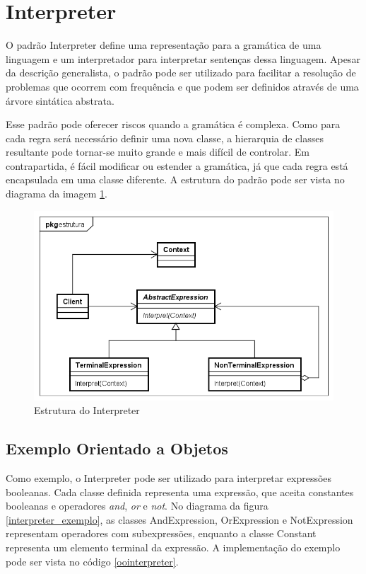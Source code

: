 \section{Interpreter}

O padrão Interpreter define uma representação para 
a gramática de uma linguagem e um interpretador para 
interpretar sentenças dessa linguagem. Apesar da 
descrição generalista, o padrão 
pode ser utilizado para facilitar a resolução de 
problemas que ocorrem com frequência e que podem 
ser definidos através de uma árvore sintática 
abstrata.

Esse padrão pode oferecer riscos quando a gramática 
é complexa. Como para cada regra será necessário 
definir uma nova classe, a hierarquia de classes 
resultante pode tornar-se muito grande e mais 
difícil de controlar. Em contrapartida, é 
fácil modificar ou estender a gramática, já 
que cada regra está encapsulada em uma classe 
diferente. A estrutura do padrão pode ser vista 
no diagrama da imagem \ref{interpreter_struct}.

\begin{figure}[htb]
	\caption{\label{interpreter_struct}Estrutura do Interpreter}
	\begin{center}
	    \includegraphics[scale=0.5]{5_padroes-contexto-funcional/5.3_comportamentais/5.3.03_interpreter/Interpreter_struct.png}
	\end{center}
\end{figure}

\subsection*{Exemplo Orientado a Objetos}

Como exemplo, o Interpreter pode ser utilizado para 
interpretar expressões booleanas. Cada classe definida 
representa uma expressão, que aceita constantes  
booleanas e operadores \textit{and}, \textit{or} e 
\textit{not}. No diagrama da figura \ref{interpreter_exemplo}, 
as classes AndExpression, OrExpression e 
NotExpression representam operadores com subexpressões, 
enquanto a classe Constant representa um elemento 
terminal da expressão. A implementação do exemplo 
pode ser vista no código \ref{oointerpreter}.

